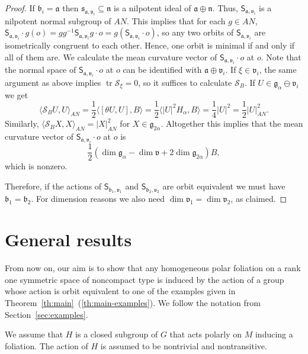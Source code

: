 \documentclass[12pt, a4paper]{amsart}
\newcommand{\g}{\mathfrak}
\newcommand{\s}{\mathsf}
\newcommand{\tr}{\operatorname{tr}}
\theoremstyle{definition}
\begin{document}
\begin{proof}
If $\g{b}_i=\g{a}$ then $\g{s}_{\g{a},\g{v}_i}\subseteq\g{n}$ is a nilpotent ideal of $\g{a}\oplus\g{n}$.
Thus, $\s{S}_{\g{a},\g{v}_i}$ is a nilpotent normal subgroup of $AN$.
This implies that for each $g\in AN$, 
$\s{S}_{\g{a},\g{v}_i}\cdot g(o)=gg^{-1}\s{S}_{\g{a},\g{v}_i}g\cdot o=g(\s{S}_{\g{a},\g{v}_i}\cdot o)$,
so any two orbits of $\s{S}_{\g{a},\g{v}_i}$ are isometrically congruent to each other.
Hence, one orbit is minimal if and only if all of them are.
We calculate the mean curvature vector of $\s{S}_{\g{a},\g{v}_i}\cdot o$ at $o$.
Note that the normal space of $\s{S}_{\g{a},\g{v}_i}\cdot o$ at $o$ can be identified with
$\g{a}\oplus\g{v}_i$.
If $\xi\in\g{v}_i$, the same argument as above implies $\tr\mathcal{S}_\xi=0$, 
so it suffices to calculate $\mathcal{S}_B$.
If $U\in\g{g}_\alpha\ominus\g{v}_i$ we get
\[
\langle\mathcal{S}_B U,U\rangle_{AN}
=\frac{1}{2}\langle[\theta U,U],B\rangle
=\frac{1}{2}\langle \lvert U \rvert^2 H_{\alpha},B\rangle
=\frac{1}{4}\lvert U \rvert^2
=\frac{1}{2}\lvert U\rvert_{AN}^2.
\]
Similarly, $\langle\mathcal{S}_B X,X\rangle_{AN}=\lvert X\rvert_{AN}^2$ for $X\in\g{g}_{2\alpha}$.
Altogether this implies that the mean curvature vector of $\s{S}_{\g{a},\g{v}_i}\cdot o$ at $o$ is
\[
\frac{1}{2}(\dim\g{g}_\alpha-\dim\g{v}+2\dim\g{g}_{2\alpha})B,
\]
which is nonzero.

Therefore, if the actions of $\s{S}_{\g{b}_1,\g{v}_1}$ and $\s{S}_{\g{b}_2,\g{v}_2}$ are orbit equivalent 
we must have $\g{b}_1=\g{b}_2$.
For dimension reasons we also need $\dim\g{v}_1=\dim\g{v}_2$, as claimed.
\end{proof}

\section{General results}\label{sec:general-results}

From now on, our aim is to show that any homogeneous polar foliation on a rank one symmetric space of noncompact type is induced by the action of a group whose action is orbit equivalent to one of the examples given in Theorem~\ref{th:main}~(\ref{th:main-examples}).
We follow the notation from Section~\ref{sec:examples}.

We assume that $H$ is a closed subgroup of $G$ that acts polarly on $M$ inducing a foliation.
The action of $H$ is assumed to be nontrivial and nontransitive.
\end{document}
